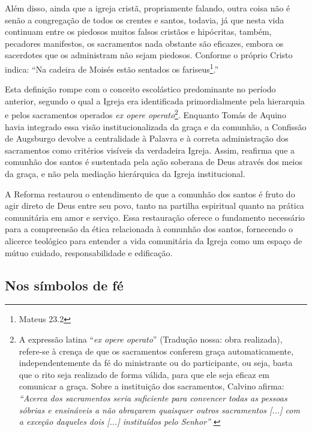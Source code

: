 \begin{citacao}
    Além disso, ainda que a igreja cristã, propriamente falando, outra coisa não é senão a congregação de todos os crentes e santos, todavia, já que nesta vida continuam entre os piedosos muitos falsos cristãos e hipócritas, também, pecadores manifestos, os sacramentos nada obstante são eficazes, embora os sacerdotes que os administram não sejam piedosos. Conforme o próprio Cristo indica: ``Na cadeira de Moisés estão sentados os fariseus\footnote{Mateus 23.2}.''\cite[Artigo~VII, p.~32]{livroConcordia}
\end{citacao}

Esta definição rompe com o conceito escolástico predominante no período anterior, segundo o qual a Igreja era identificada primordialmente pela hierarquia e pelos sacramentos operados \textit{\foreignlanguage{latin}{ex opere operato}}\footnote{A expressão latina ``\textit{\foreignlanguage{latin}{ex opere operato}}'' (Tradução nossa: obra realizada), refere-se à crença de que os sacramentos conferem graça automaticamente, independentemente da fé do ministrante ou do participante, ou seja, basta que o rito seja realizado de forma válida, para que ele seja eficaz em comunicar a graça. Sobre a instituição dos sacramentos, Calvino afirma: \textit{``Acerca dos sacramentos seria suficiente para convencer todas as pessoas sóbrias e ensináveis a não abraçarem quaisquer outros sacramentos [...] com a exceção daqueles dois [...] instituídos pelo Senhor''} \cite[v.~4, Capítulo~XIX, p.~2605]{calvino2022}}. Enquanto Tomás de Aquino havia integrado essa visão institucionalizada da graça e da comunhão, a Confissão de Augsburgo devolve a centralidade à Palavra e à correta administração dos sacramentos como critérios visíveis da verdadeira Igreja. Assim, reafirma que a comunhão dos santos é sustentada pela ação soberana de Deus através dos meios da graça, e não pela mediação hierárquica da Igreja institucional.

A Reforma restaurou o entendimento de que a comunhão dos santos é fruto do agir direto de Deus entre seu povo, tanto na partilha espiritual quanto na prática comunitária em amor e serviço. Essa restauração oferece o fundamento necessário para a compreensão da ética relacionada à comunhão dos santos, fornecendo o alicerce teológico para entender a vida comunitária da Igreja como um espaço de mútuo cuidado, responsabilidade e edificação.

\subsection{Nos símbolos de fé}


